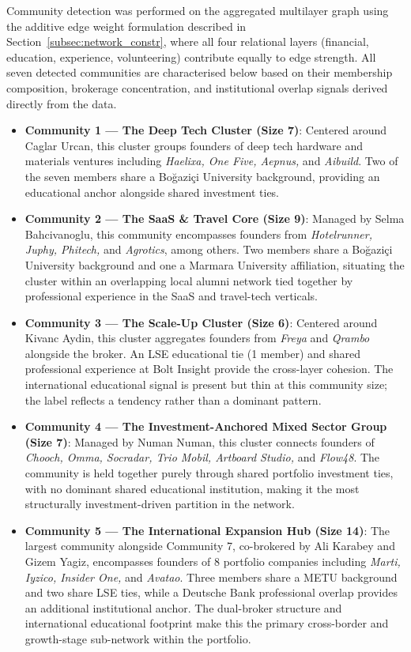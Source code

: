 \documentclass[conference]{IEEEtran}
\begin{document}
Community detection was performed on the aggregated multilayer graph using the additive edge weight formulation described in Section~\ref{subsec:network_constr}, where all four relational layers (financial, education, experience, volunteering) contribute equally to edge strength. All seven detected communities are characterised below based on their membership composition, brokerage concentration, and institutional overlap signals derived directly from the data.
\begin{itemize}
    \item \textbf{Community 1 — The Deep Tech Cluster (Size 7)}: Centered around Caglar Urcan, this cluster groups founders of deep tech hardware and materials ventures including \textit{Haelixa, One Five, Aepnus,} and \textit{Aibuild}. Two of the seven members share a Boğaziçi University background, providing an educational anchor alongside shared investment ties.
    \item \textbf{Community 2 — The SaaS \& Travel Core (Size 9)}: Managed by Selma Bahcivanoglu, this community encompasses founders from \textit{Hotelrunner, Juphy, Phitech,} and \textit{Agrotics}, among others. Two members share a Boğaziçi University background and one a Marmara University affiliation, situating the cluster within an overlapping local alumni network tied together by professional experience in the SaaS and travel-tech verticals.
    \item \textbf{Community 3 — The Scale-Up Cluster (Size 6)}: Centered around Kivanc Aydin, this cluster aggregates founders from \textit{Freya} and \textit{Qrambo} alongside the broker. An LSE educational tie (1 member) and shared professional experience at Bolt Insight provide the cross-layer cohesion. The international educational signal is present but thin at this community size; the label reflects a tendency rather than a dominant pattern.
    \item \textbf{Community 4 — The Investment-Anchored Mixed Sector Group (Size 7)}: Managed by Numan Numan, this cluster connects founders of \textit{Chooch, Omma, Socradar, Trio Mobil, Artboard Studio,} and \textit{Flow48}. The community is held together purely through shared portfolio investment ties, with no dominant shared educational institution, making it the most structurally investment-driven partition in the network.
    \item \textbf{Community 5 — The International Expansion Hub (Size 14)}: The largest community alongside Community 7, co-brokered by Ali Karabey and Gizem Yagiz, encompasses founders of 8 portfolio companies including \textit{Marti, Iyzico, Insider One,} and \textit{Avatao}. Three members share a METU background and two share LSE ties, while a Deutsche Bank professional overlap provides an additional institutional anchor. The dual-broker structure and international educational footprint make this the primary cross-border and growth-stage sub-network within the portfolio.

\end{itemize}
\end{document}
